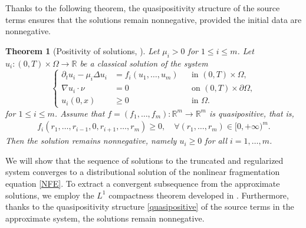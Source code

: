 \documentclass[a4paper,12pt,reqno]{amsart}
\theoremstyle{plain}
\newtheorem{thm}{Theorem}[section]
\numberwithin{equation}{section}
\begin{document}
	Thanks to the following theorem, the quasipositivity structure of the source terms ensures that the solutions remain nonnegative, provided the initial data are nonnegative.
	\begin{thm}[Positivity of solutions, \cite{Pierre2010}]\label{positivity of solution}
		Let $\mu_i>0$ for $1\le i\le m$. Let $u_i:(0,T)\times\Omega\to\mathbb{R}$ be a classical solution of the system
		\[
		\left\{
		\begin{aligned}
			\partial_t u_i - \mu_i \Delta u_i &= f_i(u_1,\dots,u_m) && \text{in } (0,T)\times\Omega,\\
			\nabla u_i\cdot\nu &= 0 && \text{on } (0,T)\times\partial\Omega,\\
			u_i(0,x) &\ge 0 && \text{in } \Omega.
		\end{aligned}
		\right.
		\]
		for $1\le i\le m$. Assume that $f=(f_1,\dots,f_m):\mathbb{R}^m\to\mathbb{R}^m$ is quasipositive, that is,
		\begin{align}\label{quasipositive}
			f_i(r_1,\dots,r_{i-1},0,r_{i+1},\dots,r_m) \ge 0,
			\quad \forall (r_1,\dots,r_m)\in [0,+\infty)^m.
		\end{align}
		Then the solution remains nonnegative, namely $u_i\ge 0$ for all $i=1,\dots,m$.
	\end{thm}
	We will show that the sequence of solutions to the truncated and regularized system converges to a distributional solution of the nonlinear fragmentation equation \eqref{NFE}. To extract a convergent subsequence from the approximate solutions, we employ the $L^1$ compactness theorem developed in \cite{Pierre2010}. Furthermore, thanks to the quasipositivity structure \eqref{quasipositive} of the source terms in the approximate system, the solutions remain nonnegative.
	
\end{document}
